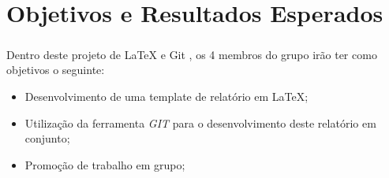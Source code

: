 \chapter*{\thechapter \quad Objetivos e Resultados Esperados}
\paragraph{}

Dentro deste projeto de LaTeX e Git , os 4 membros do grupo irão ter como objetivos o seguinte:
\begin{itemize}
   \item Desenvolvimento de uma template de relatório em LaTeX;
   \item Utilização da ferramenta \textit{GIT} para o desenvolvimento deste relatório em conjunto;
   \item Promoção de trabalho em grupo;
\end{itemize}


